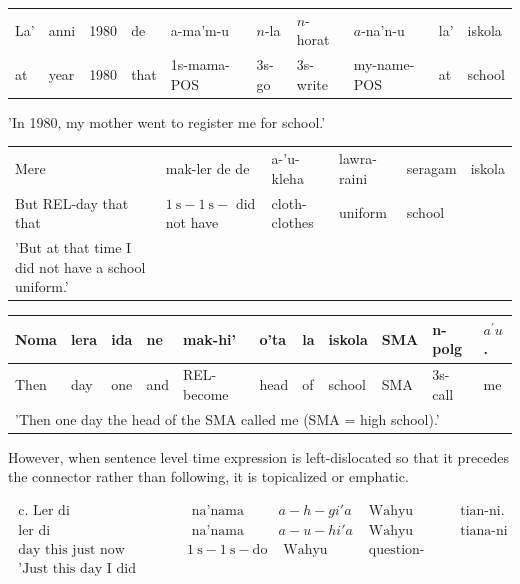 \documentclass[10pt]{article}
\begin{document}
\begin{center}
\begin{tabular}{llllllllll}
La' & anni & 1980 & de & a-ma'm-u & \(n\)-la & \(n\)-horat & \(a\)-na'n-u & la' & iskola \\
at & year & 1980 & that & 1s-mama-POS & 3s-go & 3s-write & my-name-POS & at & school \\
\end{tabular}
\end{center}

'In 1980, my mother went to register me for school.'

\begin{center}
\begin{tabular}{llllll}
Mere & mak-ler de de & a-'u-kleha & lawra-raini & seragam & iskola \\
But REL-day that that & \(1 \mathrm{~s}-1 \mathrm{~s}-\) did not have & cloth-clothes & uniform & school &  \\
'But at that time I did not have a school uniform.' &  &  &  &  &  \\
\end{tabular}
\end{center}

\begin{center}
\begin{tabular}{|l|l|l|l|l|l|l|l|l|l|l|}
\hline
Noma & lera & ida & ne & mak-hi' & o'ta & la & iskola & SMA & n-polg & \(a^{\prime} u\). \\
\hline
Then & day & one & and & REL-become & head & of & school & SMA & 3s-call & me \\
\hline
\multicolumn{11}{|l|}{'Then one day the head of the SMA called me (SMA = high school).'} \\
\hline
\end{tabular}
\end{center}

However, when sentence level time expression is left-dislocated so that it precedes the connector rather than following, it is topicalized or emphatic.

\[
\begin{array}{llllll}
\text { c. Ler di } & \text { na'nama } & a-h-g i ' a & \text { Wahyu } & \text { tian-ni. } \\
\text { ler di } & \text { na'nama } & a-u-h i ' a & \text { Wahyu } & \text { tiana-ni } \\
\text { day this just now } & 1 \mathrm{~s}-1 \mathrm{~s}-\mathrm{do} & \text { Wahyu } & \text { question-GEN } \\
\text { 'Just this day I did Wahyu's questions.' } &
\end{array}
\]
\end{document}
